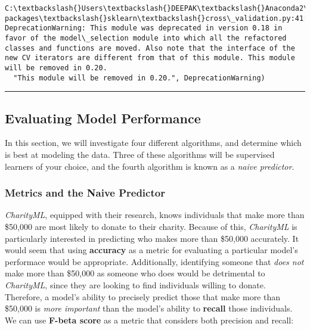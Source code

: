 \documentclass[11pt]{article}
\begin{document}
    \begin{Verbatim}[commandchars=\\\{\}]
C:\textbackslash{}Users\textbackslash{}DEEPAK\textbackslash{}Anaconda2\textbackslash{}lib\textbackslash{}site-packages\textbackslash{}sklearn\textbackslash{}cross\_validation.py:41: DeprecationWarning: This module was deprecated in version 0.18 in favor of the model\_selection module into which all the refactored classes and functions are moved. Also note that the interface of the new CV iterators are different from that of this module. This module will be removed in 0.20.
  "This module will be removed in 0.20.", DeprecationWarning)

    \end{Verbatim}

    \begin{center}\rule{0.5\linewidth}{\linethickness}\end{center}

\subsection{Evaluating Model
Performance}\label{evaluating-model-performance}

In this section, we will investigate four different algorithms, and
determine which is best at modeling the data. Three of these algorithms
will be supervised learners of your choice, and the fourth algorithm is
known as a \emph{naive predictor}.

    \subsubsection{Metrics and the Naive
Predictor}\label{metrics-and-the-naive-predictor}

\emph{CharityML}, equipped with their research, knows individuals that
make more than \$50,000 are most likely to donate to their charity.
Because of this, \emph{CharityML} is particularly interested in
predicting who makes more than \$50,000 accurately. It would seem that
using \textbf{accuracy} as a metric for evaluating a particular model's
performace would be appropriate. Additionally, identifying someone that
\emph{does not} make more than \$50,000 as someone who does would be
detrimental to \emph{CharityML}, since they are looking to find
individuals willing to donate. Therefore, a model's ability to precisely
predict those that make more than \$50,000 is \emph{more important} than
the model's ability to \textbf{recall} those individuals. We can use
\textbf{F-beta score} as a metric that considers both precision and
recall:
\end{document}
